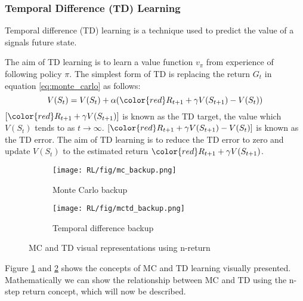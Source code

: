 \subsubsection{Temporal Difference (TD) Learning}
Temporal difference (TD) learning is a technique used to predict the value of a signals future state.

The aim of TD learning is to learn a value function $v_\pi$ from experience of following policy $\pi$. 
The simplest form of TD is replacing the return $G_t$ in equation \ref{eq:monte_carlo} as follows:
\begin{equation}
	V(S_t) = V(S_t) + \alpha({\color{red}R_{t+1} +  \gamma V(S_{t+1})} - V(S_t))
	\label{eq:monte_carlo_TD}
\end{equation}
$[{\color{red}R_{t+1} +  \gamma V(S_{t+1})}]$ is known as the TD target, the value which $V(S_t)$ tends to as $t \to \infty$.
$[{\color{red}R_{t+1} +  \gamma V(S_{t+1})} - V(S_t)]$ is known as the TD error. The aim of TD learning is to reduce the TD error to zero and update $V(S_t)$ to the estimated return ${\color{red}R_{t+1} +  \gamma V(S_{t+1})}$.
\begin{figure}[!htb]
	\centering
	\begin{subfigure}{.5\textwidth}
		\centering
		\texttt{[image: RL/fig/mc\_backup.png]}
		\caption{Monte Carlo backup\cite{David_Silver}}
		\label{fig:monte_carlo_backup}
	\end{subfigure}
	\begin{subfigure}{.49\textwidth}
	\centering
	\texttt{[image: RL/fig/mctd\_backup.png]}
	\caption{Temporal difference backup\cite{David_Silver}}
	\label{fig:monte_carlo_TD_backup}
	\end{subfigure}
	\caption{MC and TD visual representations using n-return \cite{David_Silver}}
	\label{fig:MC_TD_backups}
\end{figure}

\begin{figure}[!htb]

\end{figure}
Figure \ref{fig:monte_carlo_backup} and \ref{fig:monte_carlo_TD_backup} shows the concepts of MC and TD learning visually presented. Mathematically we can show the relationship between MC and TD using the n-step return concept, which will now be described.

